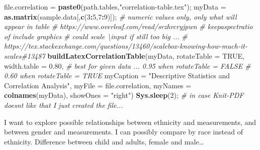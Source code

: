 \documentclass[]{article}
\newenvironment{Shaded}{\begin{snugshade}}{\end{snugshade}}
\newcommand{\CommentTok}[1]{\textcolor[rgb]{0.56,0.35,0.01}{\textit{#1}}}
\newcommand{\DataTypeTok}[1]{\textcolor[rgb]{0.13,0.29,0.53}{#1}}
\newcommand{\DecValTok}[1]{\textcolor[rgb]{0.00,0.00,0.81}{#1}}
\newcommand{\FloatTok}[1]{\textcolor[rgb]{0.00,0.00,0.81}{#1}}
\newcommand{\KeywordTok}[1]{\textcolor[rgb]{0.13,0.29,0.53}{\textbf{#1}}}
\newcommand{\NormalTok}[1]{#1}
\newcommand{\OperatorTok}[1]{\textcolor[rgb]{0.81,0.36,0.00}{\textbf{#1}}}
\newcommand{\OtherTok}[1]{\textcolor[rgb]{0.56,0.35,0.01}{#1}}
\newcommand{\StringTok}[1]{\textcolor[rgb]{0.31,0.60,0.02}{#1}}
\begin{document}
\begin{Shaded}
\begin{Highlighting}[]
\NormalTok{file.correlation =}\StringTok{ }\KeywordTok{paste0}\NormalTok{(path.tables,}\StringTok{"correlation{-}table.tex"}\NormalTok{);}
\NormalTok{myData =}\StringTok{ }\KeywordTok{as.matrix}\NormalTok{(sample.data[,}\KeywordTok{c}\NormalTok{(}\DecValTok{3}\OperatorTok{:}\DecValTok{5}\NormalTok{,}\DecValTok{7}\OperatorTok{:}\DecValTok{9}\NormalTok{)]);  }\CommentTok{\# numeric values only, only what will appear in table}
\CommentTok{\# https://www.overleaf.com/read/srzhrcryjpwn}
\CommentTok{\# keepaspectratio of include graphics }
\CommentTok{\# could scale \textbackslash{}input if still too big ...}
\CommentTok{\# https://tex.stackexchange.com/questions/13460/scalebox{-}knowing{-}how{-}much{-}it{-}scales\#13487}
\KeywordTok{buildLatexCorrelationTable}\NormalTok{(myData, }
  \DataTypeTok{rotateTable =} \OtherTok{TRUE}\NormalTok{,}
  \DataTypeTok{width.table =} \FloatTok{0.80}\NormalTok{, }\CommentTok{\# best for given data ... 0.95 when rotateTable = FALSE}
                      \CommentTok{\# 0.60 when rotateTable = TRUE}
  \DataTypeTok{myCaption =} \StringTok{"Descriptive Statistics and Correlation Analysis"}\NormalTok{,}
  \DataTypeTok{myFile =}\NormalTok{ file.correlation,}
  \DataTypeTok{myNames =} \KeywordTok{colnames}\NormalTok{(myData),}
  \DataTypeTok{showOnes =} \StringTok{"right"}\NormalTok{)}
\KeywordTok{Sys.sleep}\NormalTok{(}\DecValTok{2}\NormalTok{); }\CommentTok{\# in case Knit{-}PDF doesn\textquotesingle{}t like that I just created the file...}
\end{Highlighting}
\end{Shaded}

\newpage



\newpage

I want to explore possible relationships between ethnicity and
measurements, and between gender and measurements. I can possibly
compare by race instead of ethnicity. Difference between child and
adults, female and male\ldots{}
\end{document}
